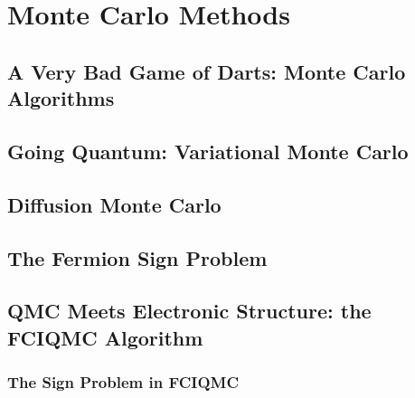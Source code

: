 \chapter{Monte Carlo Methods}
\label{chap:qmc}

\section{A Very Bad Game of Darts: Monte Carlo Algorithms}

\section{Going Quantum: Variational Monte Carlo}

\section{Diffusion Monte Carlo}

\section{The Fermion Sign Problem}

\section{QMC Meets Electronic Structure: the FCIQMC Algorithm}

\subsection{The Sign Problem in FCIQMC}
